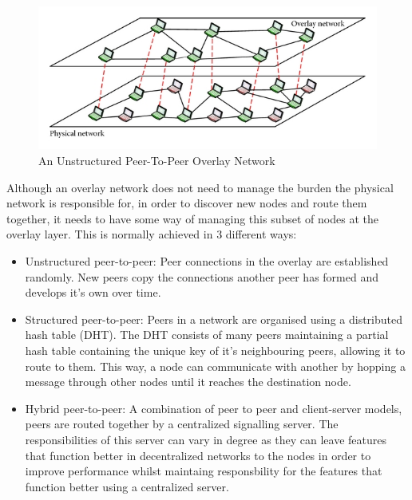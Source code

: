\documentclass[]{report}
\begin{document}
			\begin{figure}[h]
			    \caption{
			    	An Unstructured Peer-To-Peer Overlay Network 	
			    	\cite{Unstructured P2P Diagram}
			    	}
				\centering
					\includegraphics{overlaynetwork.jpg}
			\end{figure}
			
			Although an overlay network does not need to manage the burden the physical network is responsible for, in order to discover new nodes and route them together, it needs to have some way of managing this subset of nodes at the overlay layer. This is normally achieved in 3 different ways:
			
			\begin{itemize}
				\item Unstructured peer-to-peer:
					Peer connections in the overlay are established randomly. New peers copy the connections another peer has formed and develops it's own over time. \cite{P2P overlay networks}
				\item Structured peer-to-peer:
					Peers in a network are organised using a distributed hash table (DHT). The DHT consists of many peers maintaining a partial hash table containing the unique key of it's neighbouring peers, allowing it to route to them. This way, a node can communicate with another by hopping a message through other nodes until it reaches the destination node. \cite{P2P overlay networks}
				\item Hybrid peer-to-peer:
					A combination of  peer to peer and client-server models, peers are routed together by a centralized signalling server. The responsibilities of this server can vary in degree as they can leave features that function better in decentralized networks to the nodes in order to improve performance whilst maintaing responsbility for the features that function better using a centralized server.\cite{Hybrid P2P network}
			\end{itemize}
					
\end{document}
